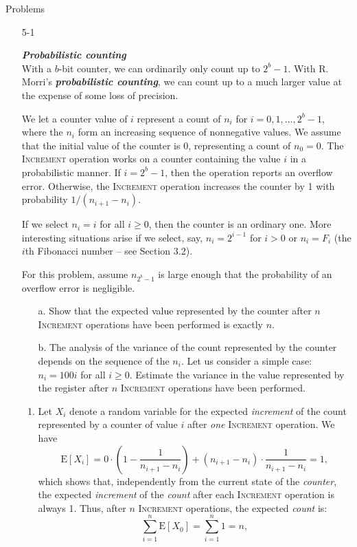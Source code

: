 \newpage

{\large Problems}

\begin{enumerate}
\item[5{-}1]{\textbf{\emph{Probabilistic counting}}\\
With a $b$-bit counter, we can ordinarily only count up to $2^b - 1$. With R.
Morri's \textbf{\emph{probabilistic counting}}, we can count up to a much larger
value at the expense of some loss of precision.

We let a counter value of $i$ represent a count of $n_i$ for
$i = 0, 1, \dots, 2^b - 1$, where the $n_i$ form an increasing sequence of
nonnegative values. We assume that the initial value of the counter is 0,
representing a count of $n_0 = 0$. The \textsc{Increment} operation works on
a counter containing the value $i$ in a probabilistic manner. If $i = 2^b - 1$,
then the operation reports an overflow error. Otherwise, the \textsc{Increment}
operation increases the counter by 1 with probability $1/(n_{i + 1} - n_i)$.

If we select $n_i = i$ for all $i \ge 0$, then the counter is an ordinary one.
More interesting situations arise if we select, say, $n_i = 2^{i - 1}$ for
$i > 0$ or $n_i = F_i$ (the $i$th Fibonacci number {--} see Section 3.2).

For this problem, assume $n_{2^b - 1}$ is large enough that the probability of
an overflow error is negligible.

\begin{enumerate}
\item[a.] Show that the expected value represented by the counter after $n$
\textsc{Increment} operations have been performed is exactly $n$.
\item[b.] The analysis of the variance of the count represented by the counter
depends on the sequence of the $n_i$. Let us consider a simple case:
$n_i = 100i$ for all $i \ge 0$. Estimate the variance in the value represented
by the register after $n$ \textsc{Increment} operations have been performed.
\end{enumerate}
}

\begin{framed}
\begin{enumerate}
\item
Let $X_i$ denote a random variable for the expected \emph{increment} of the
count represented by a counter of value $i$ after \emph{one} \textsc{Increment}
operation. We have
\[
  \text{E}[X_i] = 0 \cdot \left(1 - \frac{1}{n_{i + 1} - n_{i}}\right) + (n_{i + 1} - n_{i}) \cdot \frac{1}{n_{i + 1} - n_{i}} = 1,
\]
which shows that, independently from the current state of the \emph{counter},
the expected \emph{increment} of the \emph{count} after each \textsc{Increment}
operation is always 1. Thus, after $n$ \textsc{Increment} operations, the
expected \emph{count} is:
\[
  \sum_{i = 1}^{n} \text{E}[X_0] = \sum_{i = 1}^{n} 1 = n,
\]


\end{enumerate}
\end{framed}
\end{enumerate}
